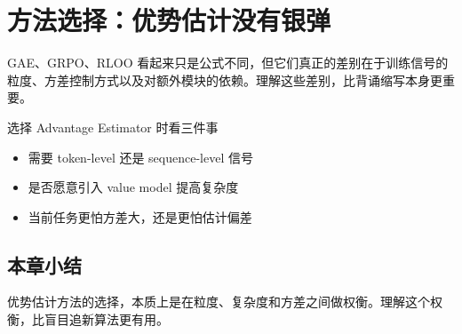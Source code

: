 \section{方法选择：优势估计没有银弹}
GAE、GRPO、RLOO 看起来只是公式不同，但它们真正的差别在于训练信号的粒度、方差控制方式以及对额外模块的依赖。理解这些差别，比背诵缩写本身更重要。

\begin{knowledgebox}{选择 Advantage Estimator 时看三件事}
\begin{itemize}
  \item 需要 token-level 还是 sequence-level 信号
  \item 是否愿意引入 value model 提高复杂度
  \item 当前任务更怕方差大，还是更怕估计偏差
\end{itemize}
\end{knowledgebox}

\subsection{本章小结}
优势估计方法的选择，本质上是在粒度、复杂度和方差之间做权衡。理解这个权衡，比盲目追新算法更有用。

\newpage

